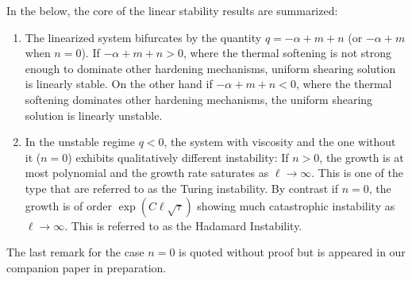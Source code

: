 \documentclass[a4paper,11pt]{article}
\theoremstyle{remark}
\begin{document}
In the below, the core of the linear stability results are summarized:
\begin{enumerate}
 \item The linearized system bifurcates by the quantity $q=-\alpha+m+n$ (or $-\alpha+m$ when $n=0$). If $-\alpha+m+n>0$, where the thermal softening is not strong enough to dominate other hardening mechanisms, uniform shearing solution is linearly stable. On the other hand if $-\alpha+m+n<0$, where the thermal softening dominates other hardening mechanisms, the uniform shearing solution is linearly unstable.%
 \item In the unstable regime $q<0$, the system with viscosity and the one without it ($n=0$) exhibits qualitatively different instability: If $n>0$, the growth is at most polynomial and the growth rate saturates as $\ell \rightarrow \infty$. This is one of the type that are referred to as the Turing instability. By contrast if $n=0$, the growth is of order $\exp\left(C\ell\sqrt{\tau}\right)$ showing much catastrophic instability as $\ell \rightarrow \infty$. This is referred to as the Hadamard Instability. 
\end{enumerate}
The last remark for the case $n=0$ is quoted without proof but is appeared in our companion paper in preparation. 
\end{document}
